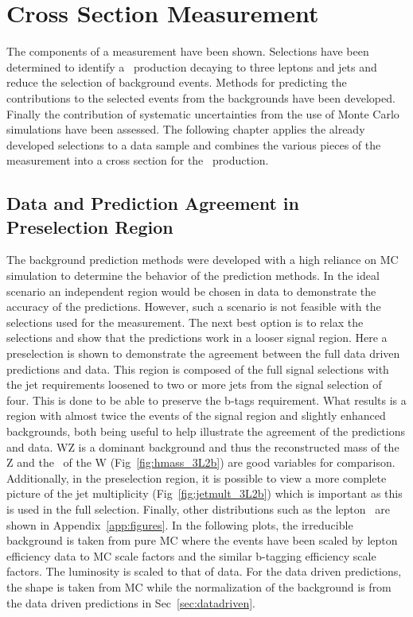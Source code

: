 \chapter{\ttZ Cross Section Measurement}
The components of a measurement have been shown. Selections have been determined to identify a \ttZ \ production decaying to three leptons and jets and reduce the selection of background events. Methods for predicting the contributions to the selected events from the backgrounds have been developed. Finally the contribution of systematic uncertainties from the use of Monte Carlo simulations have been assessed. The following chapter applies the already developed selections to a data sample and combines the various pieces of the measurement into a cross section for the \ttZ \ production.\\

         \section{Data and Prediction Agreement in Preselection Region}

         The background prediction methods were developed with a high reliance on MC simulation to determine the behavior of the prediction methods. In the ideal scenario an independent region would be chosen in data to demonstrate the accuracy of the predictions. However, such a scenario is not feasible with the selections used for the \ttZ measurement. The next best option is to relax the selections and show that the predictions work in a looser signal region. Here a preselection is shown to demonstrate the agreement between the full data driven predictions and data. This region is composed of the full signal selections with the jet requirements loosened to two or more jets from the signal selection of four. This is done to be able to preserve the b-tags requirement. What results is a region with almost twice the events of the signal region and slightly enhanced backgrounds, both being useful to help illustrate the agreement of the predictions and data. WZ is a dominant background and thus the reconstructed mass of the Z and the \Mt \ of the W (Fig~\ref{fig:hmass_3L2b}) are good variables for comparison. Additionally, in the preselection region, it is possible to view a more complete picture of the jet multiplicity (Fig~\ref{fig:jetmult_3L2b}) which is important as this is used in the full selection. Finally, other distributions such as the lepton \pt \ are shown in Appendix~\ref{app:figures}. In the following plots, the irreducible background is taken from pure MC where the events have been scaled by lepton efficiency data to MC scale factors and the similar b-tagging efficiency scale factors. The luminosity is scaled to that of data. For the data driven predictions, the shape is taken from MC while the normalization of the background is from the data driven predictions in Sec~\ref{sec:datadriven}.


